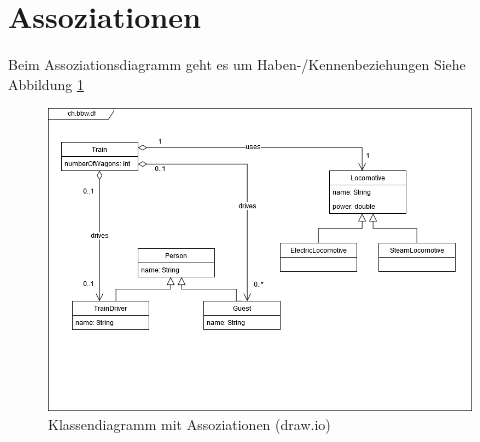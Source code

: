 \documentclass[a4paper, titlepage]{scrartcl}
\begin{document}
    \section{Assoziationen}
    Beim Assoziationsdiagramm geht es um Haben-/Kennenbeziehungen Siehe Abbildung \ref{AssoziationenDrawIO}
    \begin{figure}
        \includegraphics[width=\textwidth]{Assoziationen.png}
        \caption{Klassendiagramm mit Assoziationen (draw.io)}
        \label{AssoziationenDrawIO}
    \end{figure}
\end{document}
